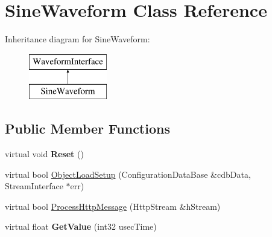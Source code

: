 \hypertarget{classSineWaveform}{
\section{SineWaveform Class Reference}
\label{classSineWaveform}
}
Inheritance diagram for SineWaveform:\begin{figure}[H]
\begin{center}
\leavevmode
\includegraphics[height=2.000000cm]{classSineWaveform}
\end{center}
\end{figure}
\subsection*{Public Member Functions}
\begin{DoxyCompactItemize}
\item 
\hypertarget{classSineWaveform_a9dbdb5198162d1eb402c4fc0f65f5c8e}{
virtual void {\bfseries Reset} ()}
\label{classSineWaveform_a9dbdb5198162d1eb402c4fc0f65f5c8e}

\item 
virtual bool \hyperlink{classSineWaveform_aed05eed95ba2325d32f68523dfa815e9}{ObjectLoadSetup} (ConfigurationDataBase \&cdbData, StreamInterface $\ast$err)
\item 
virtual bool \hyperlink{classSineWaveform_a98a9876eedef78a3f4ac1fe2cc5aa1bd}{ProcessHttpMessage} (HttpStream \&hStream)
\item 
\hypertarget{classSineWaveform_a919252ac1127ee2bb0c0e2138d32402a}{
virtual float {\bfseries GetValue} (int32 usecTime)}
\label{classSineWaveform_a919252ac1127ee2bb0c0e2138d32402a}

\end{DoxyCompactItemize}


